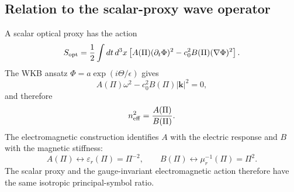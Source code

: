 \documentclass[12pt]{article}
\begin{document}
\begin{appendices}
\section{Relation to the scalar-proxy wave operator}
\label{app:scalar_proxy}

A scalar optical proxy has the action
\begin{equation}
 S_{\rm opt}=\frac12\int dt\,d^3x
 \left[A(\Pi)(\partial_t\Phi)^2-c_0^2 B(\Pi)(\nabla\Phi)^2\right].
\end{equation}
The WKB ansatz $\Phi=a\exp(i\Theta/\epsilon)$ gives
\begin{equation}
 A(\Pi)\omega^2-c_0^2B(\Pi)|\mathbf k|^2=0,
\end{equation}
and therefore
\begin{equation}
 n_{\rm eff}^2=\frac{A(\Pi)}{B(\Pi)}.
\end{equation}
The electromagnetic construction identifies $A$ with the electric response and $B$ with the magnetic stiffness:
\begin{equation}
 A(\Pi)\leftrightarrow\varepsilon_r(\Pi)=\Pi^{-2},
 \qquad
 B(\Pi)\leftrightarrow\mu_r^{-1}(\Pi)=\Pi^2.
\end{equation}
The scalar proxy and the gauge-invariant electromagnetic action therefore have the same isotropic principal-symbol ratio.

\end{appendices}
\end{document}
